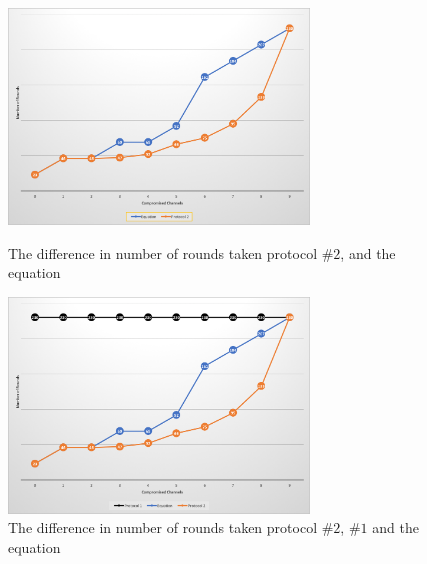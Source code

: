 \documentclass[main.tex]{subfiles}
\begin{document}
\begin{figure} [!htb]\centering
  \includegraphics[keepaspectratio, width=8cm]{pics/10Pro2Eq.png}
 \caption{The difference in number of rounds taken protocol $\#2$, and the equation}%

 \includegraphics[keepaspectratio, width=8cm]{pics/10Complete.png}
 \caption{The difference in number of rounds taken protocol $\#2$, $\#1$ and the equation}\end{figure}
 
\end{document}
